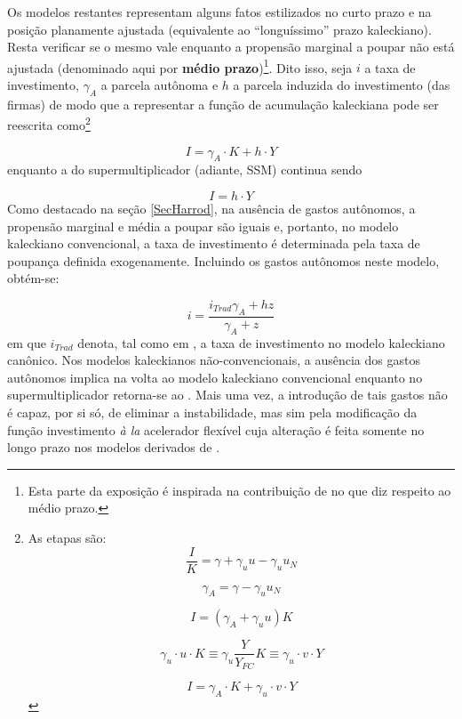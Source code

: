 Os modelos restantes representam alguns fatos estilizados no curto prazo e na posição planamente ajustada (equivalente ao ``longuíssimo'' prazo kaleckiano). Resta verificar se o mesmo vale enquanto a propensão marginal a poupar não está ajustada (denominado aqui por  \textbf{médio prazo})\footnote{Esta parte da exposição é inspirada na contribuição de \textcite{fagundes_role_2017} no que diz respeito ao médio prazo.}. 
Dito isso, seja $i$ a taxa de investimento, $\gamma_A$ a parcela autônoma e $h$ a parcela induzida do investimento (das firmas) de modo que a representar a função de acumulação kaleckiana pode ser reescrita como\footnote{
	As etapas são:
	$$
	\frac{I}{K}  = \gamma + \gamma_uu - \gamma_uu_N
	$$
	
	$$
	\gamma_A = \gamma - \gamma_uu_N
	$$
	
	$$
	I = (\gamma_A + \gamma_uu)K
	$$
	
	$$
	\gamma_u\cdot u \cdot K \equiv \gamma_u\frac{Y}{Y_{FC}}K \equiv \gamma_u\cdot v\cdot Y
	$$
	
	$$
	I = \gamma_A\cdot K + \gamma_u\cdot v\cdot Y
	$$
}

\begin{equation}
\tag{kaleckiana}
I = \gamma_A\cdot K + h\cdot Y
\end{equation}
enquanto a do supermultiplicador (adiante, SSM) continua sendo

\begin{equation}
\tag{SSM}
I = h\cdot Y
\end{equation}
Como destacado na seção \ref{SecHarrod}, na ausência de gastos autônomos, a propensão marginal e média a poupar são iguais e, portanto, no modelo kaleckiano convencional, a taxa de investimento é determinada pela taxa de poupança definida exogenamente. Incluindo os gastos autônomos neste modelo, obtém-se:

$$
i = \frac{i_{Trad}\gamma_A + hz}{\gamma_A + z}
$$
em que $i_{Trad}$ denota, tal como em \textcite{fagundes_role_2017}, a taxa de investimento no modelo kaleckiano canônico. Nos modelos kaleckianos não-convencionais, a ausência dos gastos autônomos implica na volta ao modelo kaleckiano convencional enquanto no supermultiplicador retorna-se ao \textcite{harrod_essay_1939}. Mais uma vez, a introdução de tais gastos não é capaz, por si só, de eliminar a instabilidade, mas sim pela modificação da função investimento \textit{à la} acelerador flexível cuja alteração é feita somente no longo prazo nos modelos derivados de \textcite{allain_tackling_2015}. 


